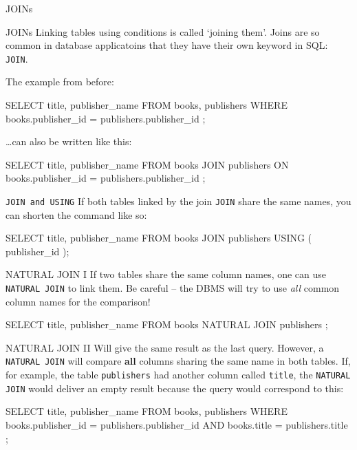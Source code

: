 \begin{frame}{JOINs}
\begin{block}{JOINs}\small
Linking tables using conditions is called `joining them'. 
Joins are so common in database applicatoins that they have their own keyword in SQL: 
 \texttt{JOIN}.

The example from before:
\begin{sqlcode}
SELECT title, publisher_name
FROM books, publishers
WHERE books.publisher_id = publishers.publisher_id ;
\end{sqlcode}
\dots can also be written like this:
\begin{sqlcode}
SELECT title, publisher_name
FROM books JOIN publishers
ON books.publisher_id = publishers.publisher_id ;
\end{sqlcode}
\end{block}


\framebreak
\begin{block}{\texttt{JOIN and USING}}\small
If both tables linked by the join \texttt{JOIN} share the same names, you can shorten the command like so: 
\begin{sqlcode}
SELECT title, publisher_name
FROM books JOIN publishers USING ( publisher_id );
\end{sqlcode}
\end{block}

\begin{block}{NATURAL JOIN I}\footnotesize
If two tables share the same column names, one can use \texttt{NATURAL JOIN} to link them. Be careful -- the DBMS will try to use \emph{all} common column names for the comparison!
\begin{sqlcode}
SELECT title, publisher_name
FROM books NATURAL JOIN publishers ;
\end{sqlcode}

\end{block}

\framebreak

\begin{block}{NATURAL JOIN II}\footnotesize
Will give the same result as the last query. However, a \texttt{NATURAL
JOIN} will compare \textbf{all} columns sharing the same name in both tables. 
If, for example, the table \texttt{publishers} had another column called \texttt{title}, the \texttt{NATURAL JOIN} would deliver an empty result because the query would correspond to this:
\begin{sqlcode}
SELECT title, publisher_name
FROM books, publishers
WHERE books.publisher_id = publishers.publisher_id
AND books.title = publishers.title ;
\end{sqlcode}


\end{block}
\end{frame}
